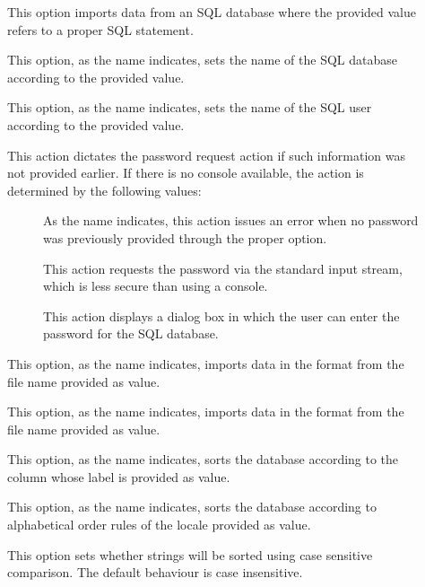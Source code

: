 \begin{description}
\begin{description}
\item[] This option imports data from an \gls{SQL} database where the provided value refers to a proper  \gls{SQL} statement.

\item[] This option, as the name indicates, sets the name of the \gls{SQL} database according to the provided value.

\item[] This option, as the name indicates, sets the name of the \gls{SQL} user according to the provided value.

\item[] This action dictates the password request action if such information was not provided earlier. If there is no console available, the action is determined by the following values:

\begin{description}
\item[] As the name indicates, this action issues an error when no password was previously provided through the proper option.

\item[] This action requests the password via the standard input stream, which is less secure than using a console.

\item[] This action displays a dialog box in which the user can enter the password for the \gls{SQL} database.
\end{description}

\item[] This option, as the name indicates, imports data in the  format from the file name provided as value.

\item[] This option, as the name indicates, imports data in the  format from the file name provided as value.

\item[] This option, as the name indicates, sorts the database according to the column whose label is provided as value.

\item[] This option, as the name indicates, sorts the database according to alphabetical order rules of the locale provided as value.

\item[] This option sets whether strings will be sorted using case sensitive comparison. The default behaviour is case insensitive.


\end{description}
\end{description}
